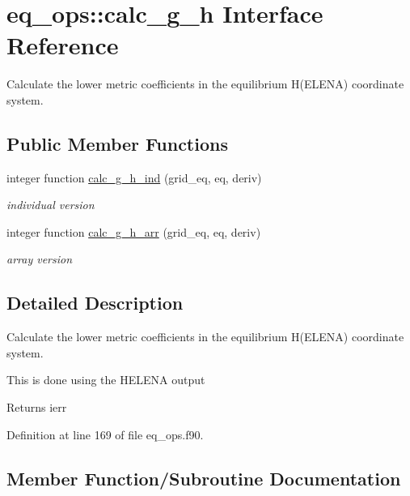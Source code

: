 \hypertarget{interfaceeq__ops_1_1calc__g__h}{}\section{eq\+\_\+ops\+:\+:calc\+\_\+g\+\_\+h Interface Reference}
\label{interfaceeq__ops_1_1calc__g__h}


Calculate the lower metric coefficients in the equilibrium H(\+E\+L\+E\+N\+A) coordinate system.  


\subsection*{Public Member Functions}
\begin{DoxyCompactItemize}
\item 
integer function \hyperlink{interfaceeq__ops_1_1calc__g__h_aa682e5ea8d778439167eea8e3eac1760}{calc\+\_\+g\+\_\+h\+\_\+ind} (grid\+\_\+eq, eq, deriv)
\begin{DoxyCompactList}\small\item\em individual version \end{DoxyCompactList}\item 
integer function \hyperlink{interfaceeq__ops_1_1calc__g__h_a4ca8a6c6aba0b1291bcfec9179f4b709}{calc\+\_\+g\+\_\+h\+\_\+arr} (grid\+\_\+eq, eq, deriv)
\begin{DoxyCompactList}\small\item\em array version \end{DoxyCompactList}\end{DoxyCompactItemize}


\subsection{Detailed Description}
Calculate the lower metric coefficients in the equilibrium H(\+E\+L\+E\+N\+A) coordinate system. 

This is done using the H\+E\+L\+E\+NA output

\begin{DoxyReturn}{Returns}
ierr 
\end{DoxyReturn}


Definition at line 169 of file eq\+\_\+ops.\+f90.



\subsection{Member Function/\+Subroutine Documentation}
\mbox{\label{interfaceeq__ops_1_1calc__g__h_a4ca8a6c6aba0b1291bcfec9179f4b709}} 
